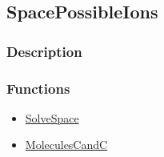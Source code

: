 \subsection{SpacePossibleIons}\label{SpacePossibleIons}
\subsubsection{Description}


\subsubsection{Functions}
\begin{itemize}
\item \hyperref[SolveSpace]{SolveSpace}
\item \hyperref[MoleculesCand]{MoleculesCandC}
\end{itemize}

